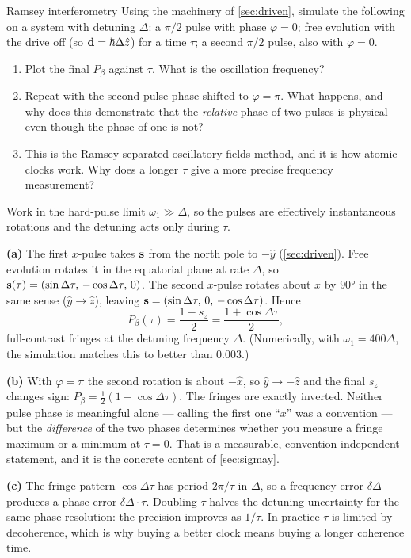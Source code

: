 \begin{problem}{Ramsey interferometry}
\label{prob:ramsey}
Using the machinery of \cref{sec:driven}, simulate the following on a system with
detuning $\Delta$: a $\pi/2$ pulse with phase $\varphi=0$; free evolution with the drive
off (so $\mathbf{d} = \hbar\Delta\hat{z}$) for a time $\tau$; a second $\pi/2$ pulse, also
with $\varphi=0$.
\begin{enumerate}[label=(\alph*),leftmargin=*,itemsep=1pt]
\item Plot the final $P_\beta$ against $\tau$. What is the oscillation frequency?
\item Repeat with the second pulse phase-shifted to $\varphi=\pi$. What happens, and why
does this demonstrate that the \emph{relative} phase of two pulses is physical even
though the phase of one is not?
\item This is the Ramsey separated-oscillatory-fields method, and it is how atomic clocks
work. Why does a longer $\tau$ give a more precise frequency measurement?
\end{enumerate}
\end{problem}

\begin{solution}
Work in the hard-pulse limit $\omega_1\gg\Delta$, so the pulses are effectively
instantaneous rotations and the detuning acts only during $\tau$.

\textbf{(a)} The first $x$-pulse takes $\mathbf{s}$ from the north pole to $-\hat{y}$
(\cref{sec:driven}). Free evolution rotates it in the equatorial plane at rate $\Delta$,
so $\mathbf{s}(\tau) = (\sin\Delta\tau,\,-\cos\Delta\tau,\,0)$. The second $x$-pulse rotates
about $\hat{x}$ by $\ang{90}$ in the same sense ($\hat{y}\to\hat{z}$), leaving
$\mathbf{s} = (\sin\Delta\tau,\,0,\,-\cos\Delta\tau)$. Hence
\[
P_\beta(\tau) = \frac{1-s_z}{2} = \frac{1+\cos\Delta\tau}{2},
\]
full-contrast fringes at the detuning frequency $\Delta$. (Numerically, with
$\omega_1 = 400\Delta$, the simulation matches this to better than $0.003$.)

\textbf{(b)} With $\varphi=\pi$ the second rotation is about $-\hat{x}$, so
$\hat{y}\to-\hat{z}$ and the final $s_z$ changes sign:
$P_\beta = \tfrac12(1-\cos\Delta\tau)$. The fringes are exactly inverted. Neither pulse
phase is meaningful alone --- calling the first one ``$x$'' was a convention --- but the
\emph{difference} of the two phases determines whether you measure a fringe maximum or a
minimum at $\tau=0$. That is a measurable, convention-independent statement, and it is
the concrete content of \cref{sec:sigmay}.

\textbf{(c)} The fringe pattern $\cos\Delta\tau$ has period $2\pi/\tau$ in $\Delta$, so a
frequency error $\delta\Delta$ produces a phase error $\delta\Delta\cdot\tau$. Doubling
$\tau$ halves the detuning uncertainty for the same phase resolution: the precision
improves as $1/\tau$. In practice $\tau$ is limited by decoherence, which is why
buying a better clock means buying a longer coherence time.
\end{solution}

